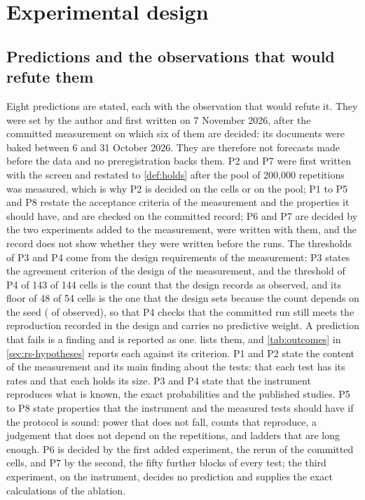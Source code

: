 \section{Experimental design}
\label{sec:experimental-design}

\subsection{Predictions and the observations that would refute them}
\label{sec:ed-predictions}

Eight predictions are stated, each with the observation that would refute it.
They were set by the author and first written on 7 November 2026, after the committed measurement on which six of them are decided: its documents were baked between 6 and 31 October 2026.
They are therefore not forecasts made before the data and no preregistration backs them.
P2 and P7 were first written with the screen and restated to \cref{def:holds} after the pool of 200,000 repetitions was measured, which is why P2 is decided on the cells or on the pool; P1 to P5 and P8 restate the acceptance criteria of the measurement and the properties it should have, and are checked on the committed record; P6 and P7 are decided by the two experiments added to the measurement, were written with them, and the record does not show whether they were written before the runs.
The thresholds of P3 and P4 come from the design requirements of the measurement: P3 states the agreement criterion of the design of the measurement, and the threshold of P4 of 143 of 144 cells is the count that the design records as observed, and its floor of 48 of 54 cells is the one that the design sets because the count depends on the seed (\ynAgree{} of \ynTotal{} observed), so that P4 checks that the committed run still meets the reproduction recorded in the design and carries no predictive weight.
A prediction that fails is a finding and is reported as one.
 lists them, and \cref{tab:outcomes} in \cref{sec:rs-hypotheses} reports each against its criterion. P1 and P2 state the content of the measurement and its main finding about the tests: that each test has its rates and that each holds its size. P3 and P4 state that the instrument reproduces what is known, the exact probabilities and the published studies. P5 to P8 state properties that the instrument and the measured tests should have if the protocol is sound: power that does not fall, counts that reproduce, a judgement that does not depend on the repetitions, and ladders that are long enough.
P6 is decided by the first added experiment, the rerun of the committed cells, and P7 by the second, the fifty further blocks of every test; the third experiment, on the instrument, decides no prediction and supplies the exact calculations of the ablation.

